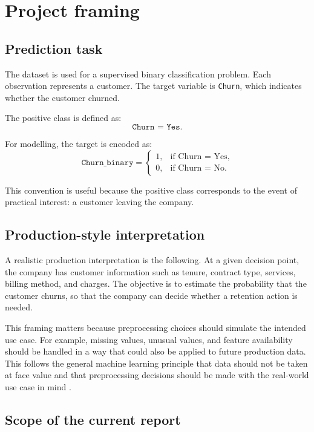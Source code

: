 \section{Project framing}

\subsection{Prediction task}

The dataset is used for a supervised binary classification problem. Each observation represents a customer. The target variable is \texttt{Churn}, which indicates whether the customer churned.

The positive class is defined as:
\[
\texttt{Churn = Yes}.
\]

For modelling, the target is encoded as:
\[
\texttt{Churn\_binary} =
\begin{cases}
1, & \text{if Churn = Yes},\\
0, & \text{if Churn = No}.
\end{cases}
\]

This convention is useful because the positive class corresponds to the event of practical interest: a customer leaving the company.

\subsection{Production-style interpretation}

A realistic production interpretation is the following. At a given decision point, the company has customer information such as tenure, contract type, services, billing method, and charges. The objective is to estimate the probability that the customer churns, so that the company can decide whether a retention action is needed.

This framing matters because preprocessing choices should simulate the intended use case. For example, missing values, unusual values, and feature availability should be handled in a way that could also be applied to future production data. This follows the general machine learning principle that data should not be taken at face value and that preprocessing decisions should be made with the real-world use case in mind \cite{ml-preprocessing}.

\subsection{Scope of the current report}

